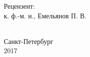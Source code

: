 \begin{titlepage}
\begin{center}
\begin{minipage}{1\textwidth}
\begin{flushright}
Рецензент:\\[-0.35cm]
к. ф.-м. н., Емельянов П. В.\\[1cm]
\end{flushright}
\end{minipage}\\[3.5cm]



{\large Санкт-Петербург \\ 2017}
\end{center} 

\end{titlepage}